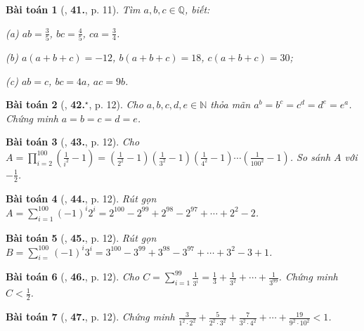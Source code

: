 \documentclass{article}
\numberwithin{equation}{section}
\newtheorem{baitoan}{Bài toán}[section]
\begin{document}
\begin{baitoan}[\cite{Binh_Toan_7_tap_1}, \textbf{41.}, p. 11]
	Tìm $a,b,c\in\mathbb{Q}$, biết:
	\begin{enumerate*}
		\item[(a)] $ab = \frac{3}{5}$, $bc = \frac{4}{5}$, $ca = \frac{3}{4}$.
		\item[(b)] $a(a + b + c) = -12$, $b(a + b + c) = 18$, $c(a + b + c) = 30$;
		\item[(c)] $ab = c$, $bc = 4a$, $ac = 9b$.
	\end{enumerate*}
\end{baitoan}

\begin{baitoan}[\cite{Binh_Toan_7_tap_1}, \textbf{42.}${}^\star$, p. 12]
	Cho $a,b,c,d,e\in\mathbb{N}$ thỏa mãn $a^b = b^c = c^d = d^e = e^a$. Chứng minh $a = b = c = d = e$.
\end{baitoan}

\begin{baitoan}[\cite{Binh_Toan_7_tap_1}, \textbf{43.}, p. 12]
	Cho $A = \prod_{i=2}^{100} \left(\frac{1}{i^2} - 1\right) = \left(\frac{1}{2^2} - 1\right)\left(\frac{1}{3^2} - 1\right)\left(\frac{1}{4^2} - 1\right)\cdots\left(\frac{1}{100^2} - 1\right)$. So sánh $A$ với $-\frac{1}{2}$.
\end{baitoan}

\begin{baitoan}[\cite{Binh_Toan_7_tap_1}, \textbf{44.}, p. 12]
	Rút gọn $A = \sum_{i=1}^{100} (-1)^i2^i = 2^{100} - 2^{99} + 2^{98} - 2^{97} + \cdots + 2^2 - 2$.
\end{baitoan}

\begin{baitoan}[\cite{Binh_Toan_7_tap_1}, \textbf{45.}, p. 12]
	Rút gọn $B = \sum_{i=
	}^{100} (-1)^i3^i = 3^{100} - 3^{99} + 3^{98} - 3^{97} + \cdots + 3^2 - 3 + 1$.
\end{baitoan}

\begin{baitoan}[\cite{Binh_Toan_7_tap_1}, \textbf{46.}, p. 12]
	Cho $C = \sum_{i=1}^{99} \frac{1}{3^i} = \frac{1}{3} + \frac{1}{3^2} + \cdots + \frac{1}{3^{99}}$. Chứng minh $C < \frac{1}{2}$.
\end{baitoan}

\begin{baitoan}[\cite{Binh_Toan_7_tap_1}, \textbf{47.}, p. 12]
	Chứng minh $\frac{3}{1^2\cdot 2^2} + \frac{5}{2^2\cdot 3^2} + \frac{7}{3^2\cdot 4^2} + \cdots + \frac{19}{9^2\cdot 10^2} < 1$.
\end{baitoan}
\end{document}
